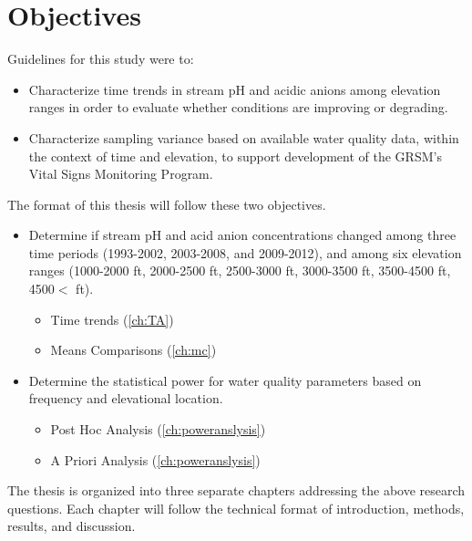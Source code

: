 \section{Objectives}
Guidelines for this study were to:
\begin{itemize}
\item  Characterize time trends in stream pH and acidic anions among elevation ranges in order to evaluate whether conditions are improving or degrading.
\item Characterize sampling variance based on available water quality data, within the context of time and elevation, to support development of the GRSM’s Vital Signs Monitoring Program. 
\end{itemize}
The format of this thesis will follow these two objectives.  
\begin{itemize}
\item Determine if stream pH and acid anion concentrations changed among three time periods (1993-2002, 2003-2008, and 2009-2012), and among six elevation ranges (1000-2000 ft, 2000-2500 ft, 2500-3000 ft, 3000-3500 ft, 3500-4500 ft, 4500$<$ ft).
\begin{itemize}
\item Time trends (\autoref{ch:TA})
 \item Means Comparisons (\autoref{ch:mc})
\end{itemize}
\item Determine the statistical power for water quality parameters based on frequency and elevational location.
\begin{itemize}
\item Post Hoc Analysis (\autoref{ch:poweranslysis})
\item A Priori Analysis (\autoref{ch:poweranslysis})
\end{itemize}
\end{itemize}
The thesis is organized into three separate chapters addressing the above research questions. Each chapter will follow the technical format of introduction, methods, results, and discussion. 




